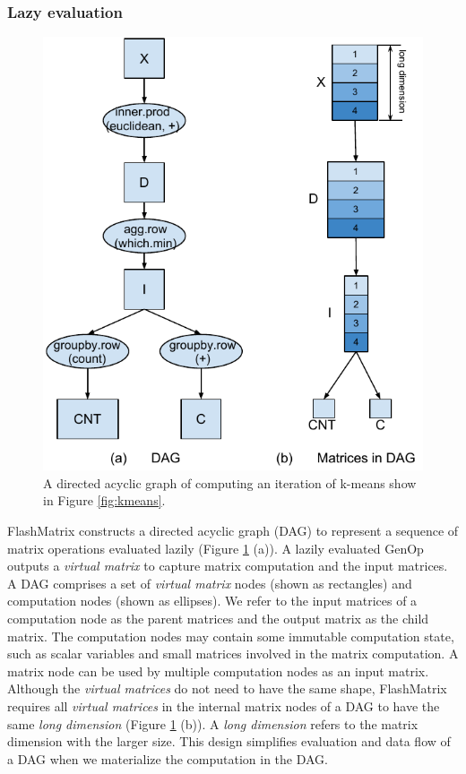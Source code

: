 \subsubsection{Lazy evaluation} \label{sec:lazy_eval}

\begin{figure}
	\centering
	\includegraphics[scale=0.6]{FlashMatrix_figs/KMeans.pdf}
	\caption{A directed acyclic graph of computing an iteration of k-means
	show in Figure \ref{fig:kmeans}.}
	\label{fig:DAG}
\end{figure}

FlashMatrix constructs a directed acyclic graph (DAG) to represent a sequence
of matrix operations evaluated lazily (Figure \ref{fig:DAG} (a)). A lazily
evaluated GenOp outputs a \textit{virtual matrix} to capture matrix computation
and the input matrices. A
DAG comprises a set of \textit{virtual matrix} nodes (shown as rectangles)
and computation nodes (shown as ellipses). We refer to the input matrices of
a computation node as the parent matrices and the output matrix as the child matrix.
The computation nodes may contain some immutable computation state, such as
scalar variables and small matrices involved in the matrix computation.
A matrix node can be used by multiple computation nodes as
an input matrix. Although the \textit{virtual matrices} do not need to have
the same shape, FlashMatrix requires all \textit{virtual matrices} in
the internal matrix nodes of a DAG to have the same \textit{long dimension}
(Figure \ref{fig:DAG} (b)). A \textit{long dimension} refers to the matrix
dimension with the larger size. This design simplifies evaluation and data flow
of a DAG when we materialize the computation in the DAG.

